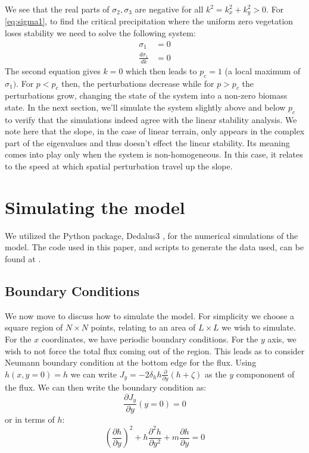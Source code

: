 \documentclass{article}
\numberwithin{equation}{section}
\begin{document}
We see that the real parts of $\sigma_2,\sigma_3$ are negative for all $k^2 = k_x^2+k_y^2>0$.
For \ref{eq:sigma1}, to find the critical precipitation where the uniform zero vegetation loses stability we need to solve the following system:
\begin{align}
    \sigma_1             & = 0  \\
    \frac{d\sigma_1}{dk} & =  0
\end{align}
The second equation gives $k=0$ which then leads to $p_c=1$ (a local maximum of $\sigma_1)$. For $p<p_c$ then, the perturbations decrease while for $p>p_c$ the perturbations grow, changing the state of the system into a non-zero biomass state.
In the next section, we'll simulate the system slightly above and below $p_c$ to verify that the simulations indeed agree with the linear stability analysis.
We note here that the slope, in the case of linear terrain, only appears in the complex part of the eigenvalues and thus doesn't effect the linear stability. Its meaning comes into play only when the system is non-homogeneous. In this case, it relates to the speed at which spatial perturbation travel up the slope.

\section{Simulating the model}
We utilized the Python package, Dedalus3 \parencite[]{dedalus2020}, for the numerical simulations of the model. The code used in this paper, and scripts to generate the data used, can be found at \cite{Ohad_Relation_Between_Biomass_2023}.

\subsection{Boundary Conditions}
We now move to discuss how to simulate the model. For simplicity we choose a square region of $N\times N$ points, relating to an area of  $L\times L$  we wish to simulate. For the $x$ coordinates, we have periodic boundary conditions. For the $y$ axis, we wish to not force the total flux coming out of the region. This leads as to consider Neumann boundary condition at the bottom edge for the flux. Using $h(x,y=0)=h$ we can write $J_y=-2\delta_h h \frac{\partial}{\partial y}(h+\zeta)$ as the $y$ compononent of the flux. We can then write the boundary condition as:
\begin{equation}
    \frac{\partial J_y}{\partial y}(y=0) = 0
\end{equation}
or in terms of $h$:
\begin{equation}
    \left(\frac{\partial h}{\partial y}\right)^2 + h \frac{\partial^2 h}{\partial y^2} + m \frac{\partial h}{\partial y} = 0
\end{equation}
\end{document}
